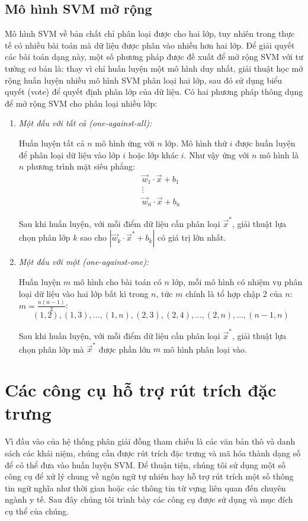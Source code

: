 \subsection*{Mô hình SVM mở rộng}
Mô hình SVM về bản chất chỉ phân loại được cho hai lớp, tuy nhiên trong thực tế có nhiều bài toán mà dữ liệu được phân vào nhiều hơn hai lớp. Để giải quyết các bài toán dạng này, một số phương pháp được đề xuất để mở rộng SVM với tư tưởng cơ bản là: thay vì chỉ huấn luyện một mô hình duy nhất, giải thuật học mở rộng huấn luyện nhiều mô hình SVM phân loại hai lớp, sau đó sử dụng biểu quyết (vote) để quyết định phân lớp của dữ liệu. Có hai phương pháp thông dụng để mở rộng SVM cho phân loại nhiều lớp:
\begin{enumerate}
\item \emph{Một đấu với tất cả (one-against-all):}

Huấn luyện tất cả $n$ mô hình ứng với $n$ lớp. Mô hình thứ $i$ được huấn luyện để phân loại dữ liệu vào lớp $i$ hoặc lớp khác $i$. Như vậy ứng với $n$ mô hình là $n$ phương trình mặt siêu phẳng:
\[
\begin{matrix}
\vec{w}_1\cdot\vec{x}+b_1\\
\vdots\\
\vec{w}_n\cdot\vec{x}+b_n
\end{matrix}
\]

Sau khi huấn luyện, với mỗi điểm dữ liệu cần phân loại $\vec{x}^*$, giải thuật lựa chọn phân lớp $k$ sao cho $|\vec{w}_k\cdot\vec{x}^*+b_k|$ có giá trị lớn nhất.
\item \emph{Một đấu với một (one-against-one):}

Huấn luyện $m$ mô hình cho bài toán có $n$ lớp, mỗi mô hình có nhiệm vụ phân loại dữ liệu vào hai lớp bất kì trong $n$, tức $m$ chính là tổ hợp chập 2 của $n$: $m=\frac{n(n-1)}{2}$:\[(1,2),(1,3),\dots,(1,n),(2,3),(2,4),\dots,(2,n),\dots,(n-1,n)\]

Sau khi huấn luyện, với mỗi điểm dữ liệu cần phân loại $\vec{x}^*$, giải thuật lựa chọn phân lớp mà $\vec{x}^*$ được phần lớn $m$ mô hình phân loại vào.
\end{enumerate}

\section{Các công cụ hỗ trợ rút trích đặc trưng\label{tools}}
Vì đầu vào của hệ thống phân giải đồng tham chiếu là các văn bản thô và danh sách các khái niệm, chúng cần được rút trích đặc trưng và mã hóa thành dạng số để có thể đưa vào huấn luyện SVM. Để thuận tiện, chúng tôi sử dụng một số công cụ để xử lý chung về ngôn ngữ tự nhiên hay hỗ trợ rút trích một số thông tin ngữ nghĩa như thời gian hoặc các thông tin từ vựng liên quan đến chuyên ngành y tế. Sau đây chúng tôi trình bày các công cụ được sử dụng và mục đích cụ thể của chúng.

